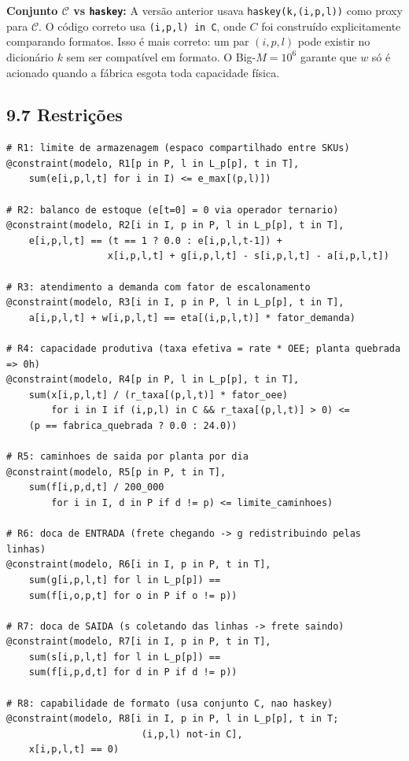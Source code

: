 \documentclass[12pt, a4paper]{article}
\begin{document}
\begin{mdframed}[style=destaque]
\textbf{\color{ballblue}Conjunto $\mathcal{C}$ vs \texttt{haskey}:}
A vers\~{a}o anterior usava \texttt{haskey(k,(i,p,l))} como proxy para $\mathcal{C}$.
O c\'{o}digo correto usa \texttt{(i,p,l) in C}, onde $C$ foi constru\'{i}do
explicitamente comparando formatos. Isso \'{e} mais correto: um par $(i,p,l)$ pode
existir no dicion\'{a}rio $k$ sem ser compat\'{i}vel em formato.
O Big-$M = 10^6$ garante que $w$ s\'{o} \'{e} acionado quando a f\'{a}brica esgota
toda capacidade f\'{i}sica.
\end{mdframed}

\subsection*{9.7 Restri\c{c}\~{o}es}

\begin{mdframed}[style=codigo]
\begin{lstlisting}
# R1: limite de armazenagem (espaco compartilhado entre SKUs)
@constraint(modelo, R1[p in P, l in L_p[p], t in T],
    sum(e[i,p,l,t] for i in I) <= e_max[(p,l)])

# R2: balanco de estoque (e[t=0] = 0 via operador ternario)
@constraint(modelo, R2[i in I, p in P, l in L_p[p], t in T],
    e[i,p,l,t] == (t == 1 ? 0.0 : e[i,p,l,t-1]) +
                  x[i,p,l,t] + g[i,p,l,t] - s[i,p,l,t] - a[i,p,l,t])

# R3: atendimento a demanda com fator de escalonamento
@constraint(modelo, R3[i in I, p in P, l in L_p[p], t in T],
    a[i,p,l,t] + w[i,p,l,t] == eta[(i,p,l,t)] * fator_demanda)

# R4: capacidade produtiva (taxa efetiva = rate * OEE; planta quebrada => 0h)
@constraint(modelo, R4[p in P, l in L_p[p], t in T],
    sum(x[i,p,l,t] / (r_taxa[(p,l,t)] * fator_oee)
        for i in I if (i,p,l) in C && r_taxa[(p,l,t)] > 0) <=
    (p == fabrica_quebrada ? 0.0 : 24.0))

# R5: caminhoes de saida por planta por dia
@constraint(modelo, R5[p in P, t in T],
    sum(f[i,p,d,t] / 200_000
        for i in I, d in P if d != p) <= limite_caminhoes)

# R6: doca de ENTRADA (frete chegando -> g redistribuindo pelas linhas)
@constraint(modelo, R6[i in I, p in P, t in T],
    sum(g[i,p,l,t] for l in L_p[p]) ==
    sum(f[i,o,p,t] for o in P if o != p))

# R7: doca de SAIDA (s coletando das linhas -> frete saindo)
@constraint(modelo, R7[i in I, p in P, t in T],
    sum(s[i,p,l,t] for l in L_p[p]) ==
    sum(f[i,p,d,t] for d in P if d != p))

# R8: capabilidade de formato (usa conjunto C, nao haskey)
@constraint(modelo, R8[i in I, p in P, l in L_p[p], t in T;
                        (i,p,l) not-in C],
    x[i,p,l,t] == 0)
\end{lstlisting}
\end{mdframed}
\end{document}
